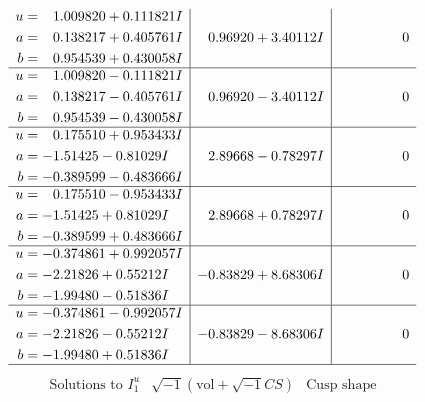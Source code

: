 \documentclass[1p]{elsarticle_modified}
\theoremstyle{definition}
\newcommand{\I}{\sqrt{-1}}
\begin{document}
$$\begin{array}{c|c|c}
\begin{aligned}
u &= \phantom{-}1.009820 + 0.111821 I \\
a &= \phantom{-}0.138217 + 0.405761 I \\
b &= \phantom{-}0.954539 + 0.430058 I\end{aligned}
 & \phantom{-}0.96920 + 3.40112 I & \phantom{-0.000000 } 0 \\ \hline\begin{aligned}
u &= \phantom{-}1.009820 - 0.111821 I \\
a &= \phantom{-}0.138217 - 0.405761 I \\
b &= \phantom{-}0.954539 - 0.430058 I\end{aligned}
 & \phantom{-}0.96920 - 3.40112 I & \phantom{-0.000000 } 0 \\ \hline\begin{aligned}
u &= \phantom{-}0.175510 + 0.953433 I \\
a &= -1.51425 - 0.81029 I \\
b &= -0.389599 - 0.483666 I\end{aligned}
 & \phantom{-}2.89668 - 0.78297 I & \phantom{-0.000000 } 0 \\ \hline\begin{aligned}
u &= \phantom{-}0.175510 - 0.953433 I \\
a &= -1.51425 + 0.81029 I \\
b &= -0.389599 + 0.483666 I\end{aligned}
 & \phantom{-}2.89668 + 0.78297 I & \phantom{-0.000000 } 0 \\ \hline\begin{aligned}
u &= -0.374861 + 0.992057 I \\
a &= -2.21826 + 0.55212 I \\
b &= -1.99480 - 0.51836 I\end{aligned}
 & -0.83829 + 8.68306 I & \phantom{-0.000000 } 0 \\ \hline\begin{aligned}
u &= -0.374861 - 0.992057 I \\
a &= -2.21826 - 0.55212 I \\
b &= -1.99480 + 0.51836 I\end{aligned}
 & -0.83829 - 8.68306 I & \phantom{-0.000000 } 0\\
 \hline 
 \end{array}$$\newpage$$\begin{array}{c|c|c}  
\text{Solutions to }I^u_{1}& \I (\text{vol} + \sqrt{-1}CS) & \text{Cusp shape}\\
 \hline 
\begin{aligned}

\end{aligned}
\end{array}$$
\end{document}
